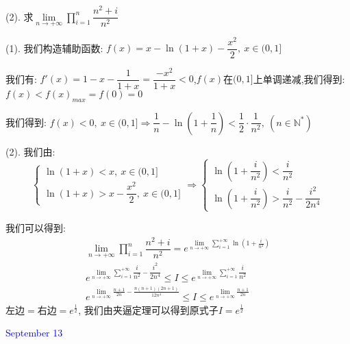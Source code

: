 (2). 求$\lim\limits_{n\to+\infty}\prod\limits_{i=1}^{n}\dfrac{n^2+i}{n^2}$
\begin{solution}

	(1). 我们构造辅助函数:  $f(x)=x-\ln(1+x)-\dfrac{x^2}{2},\ x\in(0,1]$
	
	我们有:  $f'(x)=1-x-\dfrac{1}{1+x}=\dfrac{-x^2}{1+x}<0$,$f(x)$在$(0,1]$上单调递减,我们得到:  $f(x)<f(x)_{max}=f(0)=0$
	
	我们得到:  $f(x)<0,\ x\in(0,1]\Rightarrow \dfrac{1}{n}-\ln(1+\dfrac{1}{n})<\dfrac{1}{2}\cdot\dfrac{1}{n^2},\ (n\in\mathbb{N}^{*})$
	
	(2). 我们由:  
	$$\left\lbrace
	\begin{array}{l}
		\ln(1+x)<x,\ x\in(0,1]\\
		\ln(1+x)>x-\dfrac{x^2}{2},\ x\in(0,1]
	\end{array}
	\right. \Rightarrow \left\lbrace
	\begin{array}{l}
		\ln(1+\dfrac{i}{n^2})<\dfrac{i}{n^2}\\
		\ln(1+\dfrac{i}{n^2})>\dfrac{i}{n^2}-\dfrac{i^2}{2n^4}
	\end{array}
	\right. $$
	
	我们可以得到:  
	\begin{eqnarray*}
		\lim\limits_{n\to+\infty}\prod\limits_{i=1}^{n}\dfrac{n^2+i}{n^2}=e^{\lim\limits_{n\to+\infty}\sum\limits_{i=1}^{+\infty}\ln(1+\frac{i}{n^2})}\\
		e^{\lim\limits_{n\to+\infty}\sum\limits_{i=1}^{+\infty}\dfrac{i}{n^2}-\dfrac{i^2}{2n^4}}\leq I\leq e^{\lim\limits_{n\to+\infty}\sum\limits_{i=1}^{+\infty}\dfrac{i}{n^2}}\\
		e^{\lim\limits_{n\to+\infty}\frac{n+1}{2n}-\frac{n(n+1)(2n+1)}{12n^4}}\leq I\leq e^{\lim\limits_{n\to+\infty}\frac{n+1}{2n}}
	\end{eqnarray*}
	$\text{左边}=\text{右边}=e^{\frac{1}{2}}$,
	我们由夹逼定理可以得到原式子$I=e^{\frac{1}{2}}$
\end{solution}

\textcolor{blue}{September 13}

